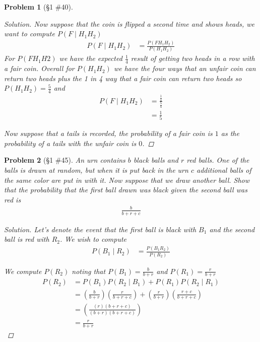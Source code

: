 \documentclass[11pt, oneside]{book}   	%
\newtheorem{problem}{Problem}[chapter]
\begin{document}
\begin{spacing}{1.618}
\begin{problem}[\S 1 \#40]
\begin{proof}[Solution]
		Now suppose that the coin is flipped a second time and shows heads, we want to compute $P(F\mid H_1H_2)$
		\begin{alignat*}{4}
			P(F\mid H_1H_2)&=\frac{P(FH_1H_2)}{P(H_1H_2)}
		\end{alignat*}
		For $P(FH_1H2)$ we have the expected $\frac{1}{4}$ result of getting two heads in a row with a fair coin. Overall for $P(H_1H_2)$ we have the four ways that an unfair coin can return two heads plus the 1 in 4 way that a fair coin can return two heads so $P(H_1H_2)=\frac{5}{4}$ and 
		\begin{alignat*}{4}
			P(F\mid H_1H_2)&=\frac{\frac{1}{4}}{\frac{5}{4}} \\
				&=\frac{1}{5}
		\end{alignat*}
		
		Now suppose that a tails is recorded, the probability of a fair coin is $1$ as the probability of a tails with the unfair coin is $0$. 
	\end{proof}
	
\end{problem}

\begin{problem}[\S 1 \#45]
	An urn contains $b$ black balls and $r$ red balls. One of the balls is drawn at random, but when it is put back in the urn $c$ additional balls of the same color are put in with it. Now suppose that we draw another ball. Show that the probability that the first ball drawn was black given the second ball was red is
	\begin{alignat}{4}
		\frac{b}{b+r+c}
	\end{alignat}
	\begin{proof}[Solution]
		Let's denote the event that the first ball is black with $B_1$ and the second ball is red with $R_2$. We wish to compute 
		\begin{alignat}{4}
			P(B_1\mid R_2)&=\frac{P(B_1R_2)}{P(R_2)}
		\end{alignat}
		
		We compute $P(R_2)$ noting that $P(B_1)=\frac{b}{b+r}$ and $P(R_1)=\frac{r}{b+r}$
		\begin{alignat}{4}
			P(R_2)&=P(B_1)P(R_2\mid B_1)+P(R_1)P(R_2\mid R_1) \\
				&=\left(\frac{b}{b+r}\right)\left(\frac{r}{b+r+c}\right)+\left(\frac{r}{b+r}\right)\left(\frac{r+c}{b+r+c}\right) \\
				&=\left(\frac{(r)(b+r+c)}{(b+r)(b+r+c)}\right) \\
				&=\frac{r}{b+r}
		\end{alignat}
		

\end{proof}
\end{problem}
\end{spacing}
\end{document}
